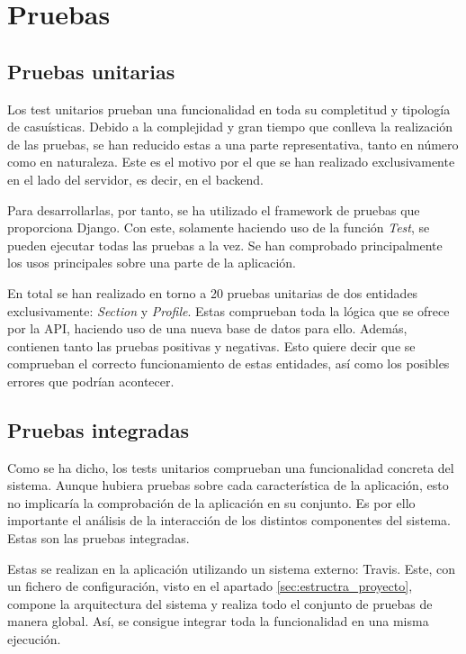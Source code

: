 
\chapter{Pruebas}\label{pruebas}
\section{Pruebas unitarias}\label{sec:pruebas_unitarias}

Los test unitarios prueban una funcionalidad en toda su completitud y tipología de casuísticas. Debido a la complejidad y gran tiempo que conlleva la realización de las pruebas, se han reducido estas a una parte representativa, tanto en número como en naturaleza. Este es el motivo por el que se han realizado exclusivamente en el lado del servidor, es decir, en el backend.

Para desarrollarlas, por tanto, se ha utilizado el framework de pruebas que proporciona Django. Con este, solamente haciendo uso de la función \textit{Test}, se pueden ejecutar todas las pruebas a la vez. Se han comprobado principalmente los usos principales sobre una parte de la aplicación.

En total se han realizado en torno a 20 pruebas unitarias de dos entidades exclusivamente: \textit{Section} y \textit{Profile}. Estas comprueban toda la lógica que se ofrece por la API, haciendo uso de una nueva base de datos para ello. Además, contienen tanto las pruebas positivas y negativas. Esto quiere decir que se comprueban el correcto funcionamiento de estas entidades, así como los posibles errores que podrían acontecer.

\section{Pruebas integradas}\label{sec:pruebas_integradas}

Como se ha dicho, los tests unitarios comprueban una funcionalidad concreta del sistema. Aunque hubiera pruebas sobre cada característica de la aplicación, esto no implicaría la comprobación de la aplicación en su conjunto. Es por ello importante el análisis de la interacción de los distintos componentes del sistema. Estas son las pruebas integradas.

Estas se realizan en la aplicación utilizando un sistema externo: Travis. Este, con un fichero de configuración, visto en el apartado \ref{sec:estructra_proyecto}, compone la arquitectura del sistema y realiza todo el conjunto de pruebas de manera global. Así, se consigue integrar toda la funcionalidad en una misma ejecución.

